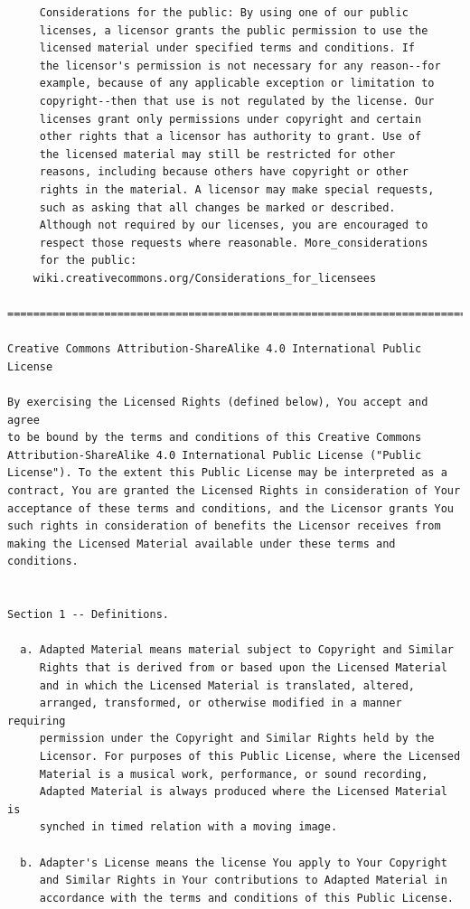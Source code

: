 \documentclass[12pt,spanish,]{article}
\begin{document}
\begin{verbatim}
     Considerations for the public: By using one of our public
     licenses, a licensor grants the public permission to use the
     licensed material under specified terms and conditions. If
     the licensor's permission is not necessary for any reason--for
     example, because of any applicable exception or limitation to
     copyright--then that use is not regulated by the license. Our
     licenses grant only permissions under copyright and certain
     other rights that a licensor has authority to grant. Use of
     the licensed material may still be restricted for other
     reasons, including because others have copyright or other
     rights in the material. A licensor may make special requests,
     such as asking that all changes be marked or described.
     Although not required by our licenses, you are encouraged to
     respect those requests where reasonable. More_considerations
     for the public:
    wiki.creativecommons.org/Considerations_for_licensees

=======================================================================

Creative Commons Attribution-ShareAlike 4.0 International Public
License

By exercising the Licensed Rights (defined below), You accept and agree
to be bound by the terms and conditions of this Creative Commons
Attribution-ShareAlike 4.0 International Public License ("Public
License"). To the extent this Public License may be interpreted as a
contract, You are granted the Licensed Rights in consideration of Your
acceptance of these terms and conditions, and the Licensor grants You
such rights in consideration of benefits the Licensor receives from
making the Licensed Material available under these terms and
conditions.


Section 1 -- Definitions.

  a. Adapted Material means material subject to Copyright and Similar
     Rights that is derived from or based upon the Licensed Material
     and in which the Licensed Material is translated, altered,
     arranged, transformed, or otherwise modified in a manner requiring
     permission under the Copyright and Similar Rights held by the
     Licensor. For purposes of this Public License, where the Licensed
     Material is a musical work, performance, or sound recording,
     Adapted Material is always produced where the Licensed Material is
     synched in timed relation with a moving image.

  b. Adapter's License means the license You apply to Your Copyright
     and Similar Rights in Your contributions to Adapted Material in
     accordance with the terms and conditions of this Public License.


\end{verbatim}
\end{document}

